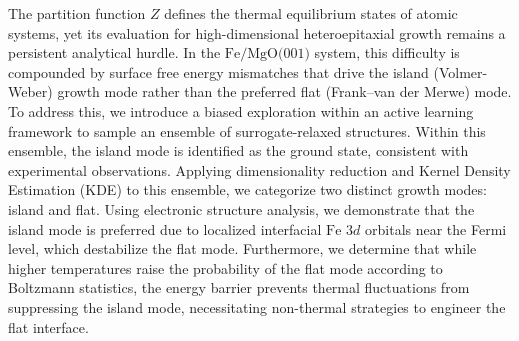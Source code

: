 The partition function $Z$ defines the thermal equilibrium states of atomic systems, yet its evaluation for high-dimensional heteroepitaxial growth remains a persistent analytical hurdle. In the $\text{Fe/MgO(001)}$ system, this difficulty is compounded by surface free energy mismatches that drive the island (Volmer-Weber) growth mode rather than the preferred flat (Frank–van der Merwe) mode. To address this, we introduce a biased exploration within an active learning framework to sample an ensemble of surrogate-relaxed structures. Within this ensemble, the island mode is identified as the ground state, consistent with experimental observations. Applying dimensionality reduction and Kernel Density Estimation (KDE) to this ensemble, we categorize two distinct growth modes: island and flat. Using electronic structure analysis, we demonstrate that the island mode is preferred due to localized interfacial $\text{Fe}$ $3d$ orbitals near the Fermi level, which destabilize the flat mode. Furthermore, we determine that while higher temperatures raise the probability of the flat mode according to Boltzmann statistics, the energy barrier prevents thermal fluctuations from suppressing the island mode, necessitating non-thermal strategies to engineer the flat interface.